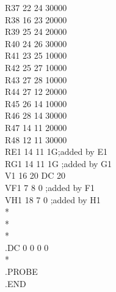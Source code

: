 \documentclass{article}
\begin{document}
R37 22 24 30000\\
R38 16 23 20000\\
R39 25 24 20000\\
R40 24 26 30000\\
R41 23 25 10000\\
R42 25 27 10000\\
R43 27 28 10000\\
R44 27 12 20000\\
R45 26 14 10000\\
R46 28 14 30000\\
R47 14 11 20000\\
R48 12 11 30000\\
RE1 14 11 1G;added by E1\\
RG1 14 11 1G ;added by G1\\
V1 16 20 DC 20\\
VF1 7 8 0 ;added by F1\\
VH1 18 7 0 ;added by H1\\
*\\

*\\
*\\
.DC 0 0 0 0\\
*\\
.PROBE\\
.END\\
\end{document}
